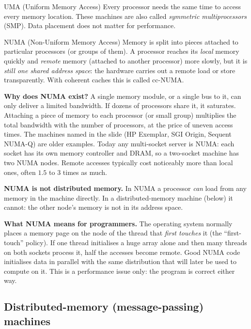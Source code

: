 \begin{definition}{UMA (Uniform Memory Access)}
Every processor needs the same time to access every memory location. These machines are also called
\emph{symmetric multiprocessors} (SMP). Data placement does not matter for performance.
\end{definition}

\begin{definition}{NUMA (Non-Uniform Memory Access)}
Memory is split into pieces attached to particular processors (or groups of them). A processor reaches
its \emph{local} memory quickly and \emph{remote} memory (attached to another processor) more slowly, but it is
\emph{still one shared address space}: the hardware carries out a remote load or store transparently. With coherent caches
this is called cc-NUMA.
\end{definition}

\textbf{Why does NUMA exist?} A single memory module, or a single bus to it, can only deliver a limited
bandwidth. If dozens of processors share it, it saturates. Attaching a piece of memory to each processor (or small group) multiplies the
total bandwidth with the number of processors, at the price of uneven access times. The machines named in
the slide (HP Exemplar, SGI Origin, Sequent NUMA-Q) are older examples. Today any multi-socket server is
NUMA: each socket has its own memory controller and DRAM, so a two-socket machine has two NUMA nodes. Remote
accesses typically cost noticeably more than local ones, often $1.5$ to $3$ times as much.

\begin{pitfall}
\textbf{NUMA is not distributed memory.} In NUMA a processor \emph{can} load from any memory in the machine
directly. In a distributed-memory machine (below) it cannot: the other node's memory is not in its address space.
\end{pitfall}

\textbf{What NUMA means for programmers.} The operating system normally places a memory page on the node of the thread that
\emph{first touches} it (the ``first-touch'' policy). If one thread initialises a huge array alone and then many threads on both sockets
process it, half the accesses become remote. Good NUMA code initialises data in parallel with the same distribution that
will later be used to compute on it. This is a performance issue only: the program is correct either way.

\subsection{Distributed-memory (message-passing) machines}

